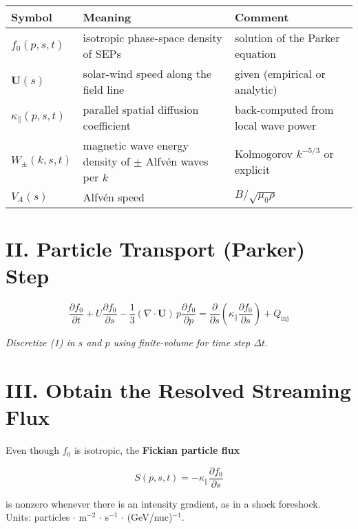 \begin{center}
\renewcommand{\arraystretch}{1.3}
\begin{tabular}{lll}
\toprule
\textbf{Symbol} & \textbf{Meaning} & \textbf{Comment} \\
\midrule
$f_0(p,s,t)$ & isotropic phase-space density of SEPs & solution of the Parker equation \\
$\boldsymbol{U}(s)$ & solar-wind speed along the field line & given (empirical or analytic) \\
$\kappa_\parallel(p,s,t)$ & parallel spatial diffusion coefficient & back-computed from local wave power \\
$W_\pm(k,s,t)$ & magnetic wave energy density of $\pm$ Alfvén waves per $k$ & Kolmogorov $k^{-5/3}$ or explicit \\
$V_A(s)$ & Alfvén speed & $B/\sqrt{\mu_0\rho}$ \\
\bottomrule
\end{tabular}
\end{center}

\section*{II. Particle Transport (Parker) Step}

\begin{equation}
\boxed{
\frac{\partial f_0}{\partial t}
+ U \frac{\partial f_0}{\partial s}
- \frac{1}{3}(\nabla\cdot\boldsymbol{U})\,p\frac{\partial f_0}{\partial p}
= \frac{\partial}{\partial s}\left( \kappa_\parallel \frac{\partial f_0}{\partial s} \right)
+ Q_{\text{inj}}
}
\tag{1}
\end{equation}

\textit{Discretize (1) in $s$ and $p$ using finite-volume for time step $\Delta t$.}

\section*{III. Obtain the Resolved Streaming Flux}

Even though $f_0$ is isotropic, the \textbf{Fickian particle flux}

\begin{equation}
\boxed{
S(p,s,t) = -\kappa_\parallel \frac{\partial f_0}{\partial s}
}
\tag{2}
\end{equation}

is nonzero whenever there is an intensity gradient, as in a shock foreshock.\\
Units: particles $\cdot$ m$^{-2}$ $\cdot$ s$^{-1}$ $\cdot$ (GeV/nuc)$^{-1}$.

